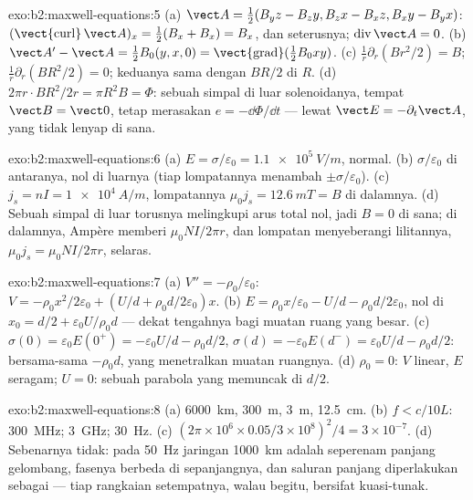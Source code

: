\begin{solution}{exo:b2:maxwell-equations:5}
(a) $\vect A = \tfrac12(B_yz - B_zy, B_zx - B_xz, B_xy - B_yx)$: $(\operatorname{\vect{curl}}
\vect A)_x = \tfrac12(B_x + B_x) = B_x$, dan seterusnya; $\operatorname{div}\vect A = 0$. (b)
$\vect A' - \vect A = \tfrac12B_0(y, x, 0) = \operatorname{\vect{grad}}(\tfrac12B_0xy)$. (c)
$\frac1r\partial_r(Br^2/2) = B$; $\frac1r\partial_r(BR^2/2) = 0$; keduanya sama dengan $BR/2$ di
$R$. (d) $2\pi r\cdot BR^2/2r = \pi R^2B = \Phi$: sebuah simpal di luar solenoidanya,
tempat $\vect B = \vect 0$, tetap merasakan $e = -\dd\Phi/\dd t$ --- lewat $\vect E =
-\partial_t\vect A$, yang tidak lenyap di sana.
\end{solution}

\begin{solution}{exo:b2:maxwell-equations:6}
(a) $E = \sigma/\varepsilon_0 = \qty{1.1e5}{V/m}$, normal. (b) $\sigma/\varepsilon_0$ di antaranya, nol
di luarnya (tiap lompatannya menambah $\pm\sigma/\varepsilon_0$). (c) $j_s = nI = \qty{1e4}{A/m}$, lompatannya
$\mu_0j_s = \qty{12.6}{mT} = B$ di dalamnya. (d) Sebuah simpal di luar torusnya melingkupi
arus total nol, jadi $B = 0$ di sana; di dalamnya, Ampère memberi $\mu_0NI/2\pi r$,
dan lompatan menyeberangi lilitannya, $\mu_0j_s = \mu_0NI/2\pi r$, selaras.
\end{solution}

\begin{solution}{exo:b2:maxwell-equations:7}
(a) $V'' = -\rho_0/\varepsilon_0$: $V = -\rho_0x^2/2\varepsilon_0 + (U/d + \rho_0d/2\varepsilon_0)x$. (b)
$E = \rho_0x/\varepsilon_0 - U/d - \rho_0d/2\varepsilon_0$, nol di $x_0 = d/2 + \varepsilon_0U/\rho_0d$
--- dekat tengahnya bagi muatan ruang yang besar. (c) $\sigma(0) = \varepsilon_0E(0^+) =
-\varepsilon_0U/d - \rho_0d/2$, $\sigma(d) = -\varepsilon_0E(d^-) = \varepsilon_0U/d - \rho_0d/2$: bersama-sama
$-\rho_0d$, yang menetralkan muatan ruangnya. (d) $\rho_0 = 0$: $V$ linear, $E$
seragam; $U = 0$: sebuah parabola yang memuncak di $d/2$.
\end{solution}

\begin{solution}{exo:b2:maxwell-equations:8}
(a) \qty{6000}{km}, \qty{300}{m}, \qty{3}{m}, \qty{12.5}{cm}. (b) $f < c/10L$:
\qty{300}{MHz}; \qty{3}{GHz}; \qty{30}{Hz}. (c) $(2\pi \times 10^6 \times 0.05/3 \times 10^8)^2/4 =
3 \times 10^{-7}$. (d) Sebenarnya tidak: pada \qty{50}{Hz} jaringan \qty{1000}{km} adalah
seperenam panjang gelombang, fasenya berbeda di sepanjangnya, dan saluran panjang
diperlakukan sebagai  --- tiap rangkaian setempatnya, walau begitu,
bersifat kuasi-tunak.
\end{solution}

